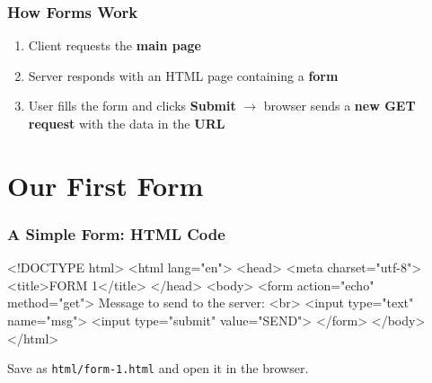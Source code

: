 \documentclass[xcolor=table]{beamer}
\begin{document}
\begin{frame}
\frametitle{How Forms Work}

\begin{center}
\end{center}

\vspace{0.3cm}

\begin{enumerate}
\item Client requests the \textbf{main page}
\item Server responds with an HTML page containing a \textbf{form}
\item User fills the form and clicks \textbf{Submit} $\rightarrow$ browser sends a \textbf{new GET request} with the data in the \textbf{URL}
\end{enumerate}

\end{frame}


\section{Our First Form}

\begin{frame}[fragile]
\frametitle{A Simple Form: HTML Code}

\begin{htmlcode}
<!DOCTYPE html>
<html lang="en">
  <head>
    <meta charset="utf-8">
    <title>FORM 1</title>
  </head>
  <body>
    <form action="echo" method="get">
      Message to send to the server: <br>
      <input type="text" name="msg">
      <input type="submit" value="SEND">
    </form>
  </body>
</html>
\end{htmlcode}

\vspace{0.1cm}

Save as \texttt{html/form-1.html} and open it in the browser.

\end{frame}
\end{document}

